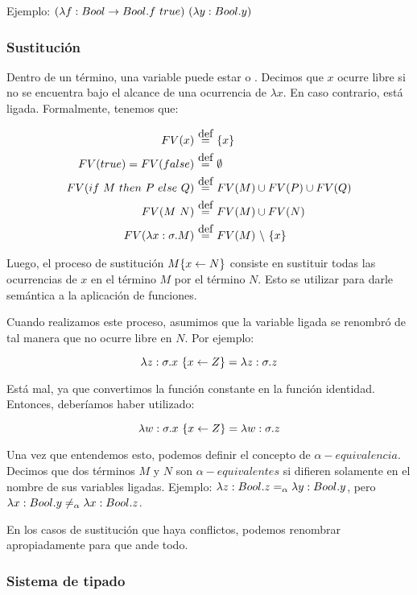 Ejemplo: $\app{(\abs{f}{Bool \to Bool}{f\ true})}{(\abs{y}{Bool}{y})}$

\subsubsection{Sustitución}

Dentro de un término, una variable puede estar  o . Decimos que $x$ ocurre libre si no se encuentra bajo el alcance de una ocurrencia de $\lambda x$. En caso contrario, está ligada. Formalmente, tenemos que:

\begin{align*}
FV(x) &\eqdef \{x\} \\
FV(true) = FV (false) &\eqdef \emptyset \\
FV(\ifte{M}{P}{Q}) &\eqdef FV(M) \cup FV(P) \cup FV(Q) \\
FV(\app{M}{N}) &\eqdef FV(M) \cup FV(N) \\
FV(\abs{x}{\sigma}{M}) &\eqdef FV(M)\ \backslash\ \{x\} \\
\end{align*}

Luego, el proceso de sustitución $M\{x \leftarrow N\}$ consiste en sustituir todas las ocurrencias  de $x$ en el término $M$ por el término $N$. Esto se utilizar para darle semántica a la aplicación de funciones.

Cuando realizamos este proceso, asumimos que la variable ligada se renombró de tal manera que no ocurre libre en $N$. Por ejemplo:

\[ \lambda z:\sigma.x\ \{x\leftarrow Z\} = \lambda z:\sigma.z\]

Está mal, ya que convertimos la función constante  en la función identidad. Entonces, deberíamos haber utilizado:

\[ \lambda w:\sigma.x\ \{x\leftarrow Z\} = \lambda w:\sigma.z\]

Una vez que entendemos esto, podemos definir el concepto de $\alpha-equivalencia$. Decimos que dos términos $M$ y $N$ son $\alpha-equivalentes$ si difieren solamente en el nombre de sus variables ligadas. Ejemplo: $\lambda z:Bool.z =_{\alpha} \lambda y:Bool.y$, pero $\lambda x:Bool.y \neq_{\alpha} \lambda x:Bool.z$.

En los casos de sustitución que haya conflictos, podemos renombrar apropiadamente para que ande todo.

\subsubsection{Sistema de tipado}

